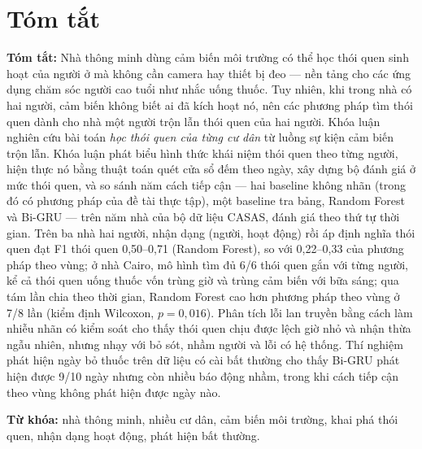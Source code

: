 \chapter*{Tóm tắt}

\textbf{Tóm tắt:} Nhà thông minh dùng cảm biến môi trường có thể học thói quen sinh hoạt của người ở mà
không cần camera hay thiết bị đeo --- nền tảng cho các ứng dụng chăm sóc người cao tuổi như nhắc uống
thuốc. Tuy nhiên, khi trong nhà có hai người, cảm biến không biết ai đã kích hoạt nó, nên các phương
pháp tìm thói quen dành cho nhà một người trộn lẫn thói quen của hai người. Khóa luận nghiên cứu bài toán
\emph{học thói quen của từng cư dân} từ luồng sự kiện cảm biến trộn lẫn. Khóa luận phát biểu hình thức
khái niệm thói quen theo từng người, hiện thực nó bằng thuật toán quét cửa sổ đếm theo ngày, xây dựng bộ
đánh giá ở mức thói quen, và so sánh năm cách tiếp cận --- hai baseline không nhãn (trong đó có phương
pháp của đề tài thực tập), một baseline tra bảng, Random Forest và Bi-GRU --- trên năm nhà của bộ dữ liệu
CASAS, đánh giá theo thứ tự thời gian. Trên ba nhà hai người, nhận dạng (người, hoạt động) rồi áp định
nghĩa thói quen đạt F1 thói quen 0,50--0,71 (Random Forest), so với 0,22--0,33 của phương pháp theo vùng;
ở nhà Cairo, mô hình tìm đủ 6/6 thói quen gắn với từng người, kể cả thói quen uống thuốc vốn trùng giờ và
trùng cảm biến với bữa sáng; qua tám lần chia theo thời gian, Random Forest cao hơn phương pháp theo vùng ở 7/8
lần (kiểm định Wilcoxon, $p = 0{,}016$). Phân tích lỗi lan truyền bằng cách làm nhiễu nhãn có kiểm soát cho thấy thói
quen chịu được lệch giờ nhỏ và nhận thừa ngẫu nhiên, nhưng nhạy với bỏ sót, nhầm người và lỗi có hệ
thống. Thí nghiệm phát hiện ngày bỏ thuốc trên dữ liệu có cài bất thường cho thấy Bi-GRU phát hiện được
9/10 ngày nhưng còn nhiều báo động nhầm, trong khi cách tiếp cận theo vùng không phát hiện được ngày nào.

\textbf{Từ khóa:} nhà thông minh, nhiều cư dân, cảm biến môi trường, khai phá thói quen, nhận dạng hoạt
động, phát hiện bất thường.

